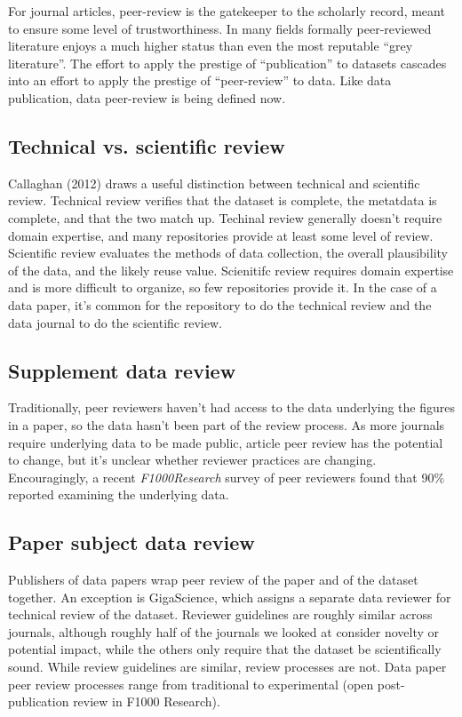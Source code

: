 \documentclass[10pt,a4paper,twocolumn]{article}
\begin{document}
For journal articles, peer-review is the gatekeeper to the scholarly record, meant to ensure some level of trustworthiness.
In many fields formally peer-reviewed literature enjoys a much higher status than even the most reputable ``grey literature''.
The effort to apply the prestige of ``publication'' to datasets cascades into an effort to apply the prestige of ``peer-review'' to data.
Like data publication, data peer-review is being defined now.

\subsection*{Technical vs. scientific review}
Callaghan (2012)\cite{callaghan_making_2012} draws a useful distinction between technical and scientific review. 
Technical review verifies that the dataset is complete, the metatdata is complete, and that the two match up.  
Techinal review generally doesn't require domain expertise, and many repositories provide at least some level of review. 
Scientific review evaluates the methods of data collection, the overall plausibility of the data, and the likely reuse value. 
Scienitifc review requires domain expertise and is more difficult to organize, so few repositories provide it.
In the case of a data paper, it's common for the repository to do the technical review and the data journal to do the scientific review.

\subsection*{Supplement data review}
Traditionally, peer reviewers haven't had access to the data underlying the figures in a paper, so the data hasn't been part of the review process.
As more journals require underlying data to be made public, article peer review has the potential to change, but it's unclear whether reviewer practices are changing.
Encouragingly, a recent \emph{F1000Research} survey of peer reviewers found that 90\% reported examining the underlying data.

\subsection*{Paper subject data review}
Publishers of data papers wrap peer review of the paper and of the dataset together. 
An exception is GigaScience\cite{gigascience}, which assigns a separate data reviewer for technical review of the dataset. 
Reviewer guidelines are roughly similar across journals, although roughly half of the journals we looked at consider novelty or potential impact, while the others only require that the dataset be scientifically sound.
While review guidelines are similar, review processes are not. 
Data paper peer review processes range from traditional to experimental (open post-publication review in F1000 Research).
\end{document}
